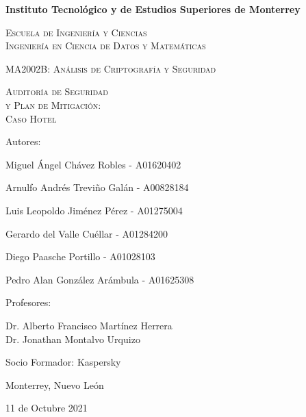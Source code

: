 \documentclass[10pt]{article}
\begin{document}
\begin{titlepage}
\centering
{\bfseries\Large Instituto Tecnológico y de Estudios Superiores de Monterrey \par}


{\scshape\Large Escuela de Ingeniería y Ciencias \\ Ingeniería en Ciencia de Datos y Matemáticas\par}


{\scshape\Large MA2002B: Análisis de Criptografía y Seguridad \par}

\vspace{.5cm}

{\scshape\Huge Auditoría de Seguridad \\y Plan de Mitigación: \\ Caso Hotel\par}

\vspace{.5cm}

{\Large Autores: \par}
{\Large Miguel Ángel Chávez Robles - A01620402 \par}
{\Large Arnulfo Andrés Treviño Galán - A00828184 \par}
{\Large Luis Leopoldo Jiménez Pérez - A01275004 \par}
{\Large Gerardo del Valle Cuéllar - A01284200 \par}
{\Large Diego Paasche Portillo - A01028103 \par}
{\Large Pedro Alan González Arámbula - A01625308 \par}

\vspace{.5cm}

{\Large Profesores: \par}
{\Large Dr. Alberto Francisco Martínez Herrera \\
Dr. Jonathan Montalvo Urquizo \par}

\vspace{.5cm}

{\Large Socio Formador: Kaspersky \par}


{\Large Monterrey, Nuevo León\par}


{\Large 11 de Octubre 2021 \par}
\end{titlepage}

\tableofcontents
\listoffigures
\pagebreak
\end{document}
